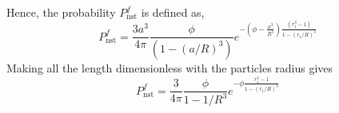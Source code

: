 Hence, the probability $P_\text{nst}^f$ is defined as, 
\begin{equation}
    P_\text{nst}^f
    =
    \frac{3 a^3}{4 \pi}\frac{\phi}{ (1 - (a/R)^3)}
    e^{- (\phi - \frac{a^3}{ R^3})\frac{(r_1^3 - 1)}{1 - (r_1/R)^3}   }
\end{equation}
Making all the length dimensionless with the particles radius gives 
\begin{equation}
    P_\text{nst}^f
    =
    \frac{3 }{4 \pi}\frac{\phi}{ 1 - 1/R^3}
    e^{- \phi \frac{r_1^3 -1 }{1 - (r_1/R)^3}}
\end{equation}